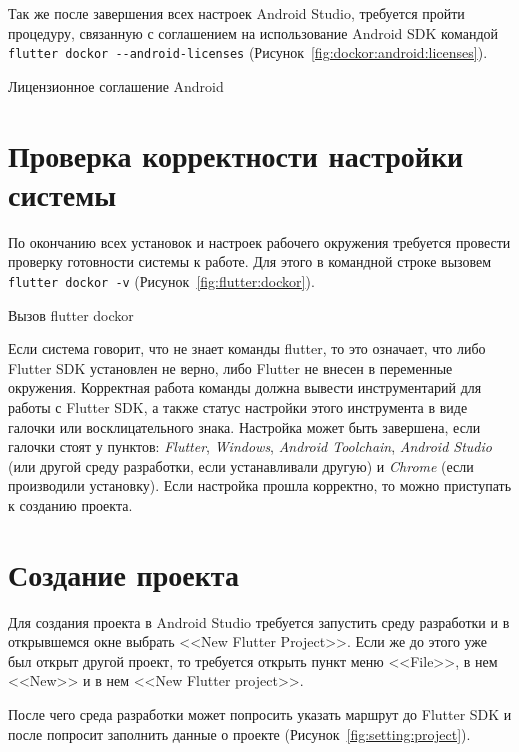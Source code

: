 Так же после завершения всех настроек Android Studio,
требуется пройти процедуру, связанную с соглашением на использование
Android SDK командой \verb|flutter dockor --android-licenses|
(Рисунок~\ref{fig:dockor:android:licenses}).

\begin{image}
	\caption{Лицензионное соглашение Android}
	\label{fig:dockor:android:licenses}
\end{image}

\section{Проверка корректности настройки системы}

По окончанию всех установок и настроек рабочего окружения требуется
провести проверку готовности системы к работе.
Для этого в командной строке вызовем \texttt{flutter dockor -v}
(Рисунок~\ref{fig:flutter:dockor}).

\begin{image}
	\caption{Вызов flutter dockor}
	\label{fig:flutter:dockor}
\end{image}

Если система говорит, что не знает команды flutter,
то это означает, что либо Flutter SDK установлен не верно,
либо Flutter не внесен в переменные окружения.
Корректная работа команды должна вывести инструментарий
для работы с Flutter SDK,
а также статус настройки этого инструмента в виде галочки
или восклицательного знака. Настройка может быть завершена,
если галочки стоят у пунктов: \textit{Flutter}, \textit{Windows},
\textit{Android Toolchain}, \textit{Android Studio}
(или другой среду разработки, если устанавливали другую)
и \textit{Chrome} (если производили установку).
Если настройка прошла корректно, то можно приступать к созданию проекта.

\section{Создание проекта}

Для создания проекта в Android Studio требуется запустить среду разработки
и в открывшемся окне выбрать <<New Flutter Project>>.
Если же до этого уже был открыт другой проект,
то требуется открыть пункт меню <<File>>, в нем <<New>>
и в нем <<New Flutter project>>.\par
После чего среда разработки может попросить указать маршрут до Flutter SDK
и после попросит заполнить данные о проекте
(Рисунок~\ref{fig:setting:project}).


